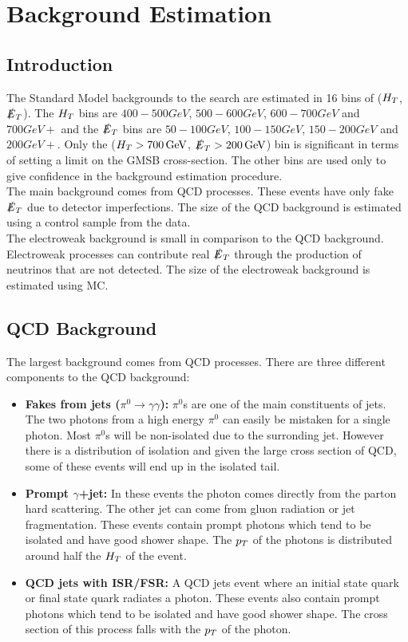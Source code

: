 \chapter{Background Estimation}

\section{Introduction}

The Standard Model backgrounds to the search are estimated in 16 bins of ($H_{T}$,
$\slashed{E}_{T}$). The $H_{T}$ bins are $400-500\unit{GeV}$, $500-600\unit{GeV}$,
$600-700\unit{GeV}$ and $700\unit{GeV}+$ and the $\slashed{E}_{T}$ bins are
$50-100\unit{GeV}$, $100-150\unit{GeV}$, $150-200\unit{GeV}$ and
$200\unit{GeV}+$. Only the ($H_{T}>700\, \mathrm{GeV}$, $\slashed{E}_{T}>200\, \mathrm{GeV}$) bin is
significant in terms of setting a limit on the GMSB cross-section. The other
bins are used only to give confidence in the background estimation procedure. \\

The main background comes from QCD processes. These events have only fake $\slashed{E}_{T}$
due to detector imperfections. The size of the QCD background is estimated using 
a control sample from the data. \\

The electroweak background is small in comparison to the QCD background.
Electroweak processes can contribute real $\slashed{E}_{T}$ through the production of
neutrinos that are not detected. The size of the electroweak background is 
estimated using MC.

\section{QCD Background}
\label{sec:QCD_Background}

The largest background comes from QCD processes. There are three different 
components to the QCD background:

\begin{itemize}
\item {\bf Fakes from jets ($\pi^{0}\rightarrow\gamma\gamma$):} $\pi^{0}$s are
one of the main constituents of jets. The two photons from a high energy 
$\pi^{0}$ can easily be mistaken for a single photon. Most $\pi^{0}$s will be 
non-isolated due to the surronding jet. However there is a distribution of 
isolation and given the large cross section of QCD, some of these events will 
end up in the isolated tail.
\item {\bf Prompt $\gamma$+jet:} In these events the photon comes directly from
the parton hard scattering. The other jet can come from gluon radiation or
jet fragmentation. These events contain prompt photons which tend to be isolated
and have good shower shape. The $p_{T}$ of the photons is distributed around half
the $H_{T}$ of the event.
\item {\bf QCD jets with ISR/FSR:} A QCD jets event where an initial state quark
or final state quark radiates a photon. These events also contain prompt photons
which tend to be isolated and have good shower shape. The cross section of this 
process falls with the $p_{T}$ of the photon. 
\end{itemize}

